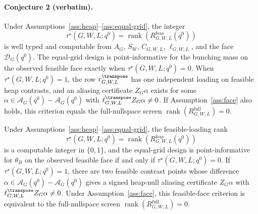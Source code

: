 
\paragraph{Conjecture 2 (verbatim).}
Under Assumptions~\ref{ass:heap}--\ref{ass:equal-grid}, the integer
\[
\tau^\star(G,W,L;q^0)=\operatorname{rank}(R^{\mathrm{feas}}_{G,W,L}(q^0))
\]
is well typed and computable from \(A_G\), \(S_W\), \(C_{G,W,L}\), \(\ell_{G,W,L}\), and the face \(\mathcal{D}_G(q^0)\).  The equal-grid design is point-informative for the bunching mass on the observed feasible face exactly when \(\tau^\star(G,W,L;q^0)=0\).  When \(\tau^\star(G,W,L;q^0)=1\), the row \(r_{G,W,L}^{\transpose}\) has one independent loading on feasible heap contrasts, and an aliasing certificate \(Z_G\alpha\) exists for some \(\alpha\in\mathcal{A}_G(q^0)-\mathcal{A}_G(q^0)\) with \(\ell_{G,W,L}^{\transpose}Z_G\alpha\neq0\).  If Assumption~\ref{ass:face} also holds, this criterion equals the full-nullspace screen \(\operatorname{rank}(R^{\mathrm{full}}_{G,W,L})=0\).

\begin{theorem}\label{thm:phase}
Under Assumptions~\ref{ass:heap}--\ref{ass:equal-grid}, the feasible-loading rank
\[
\tau^\star(G,W,L;q^0)=\operatorname{rank}(R^{\mathrm{feas}}_{G,W,L}(q^0))
\]
is a computable integer in \(\{0,1\}\), and the equal-grid design is point-informative for \(\theta_B\) on the observed feasible face if and only if \(\tau^\star(G,W,L;q^0)=0\).  If \(\tau^\star(G,W,L;q^0)=1\), there are two feasible contrast points whose difference \(\alpha\in\mathcal{A}_G(q^0)-\mathcal{A}_G(q^0)\) gives a signed heap-null aliasing certificate \(Z_G\alpha\) with \(\ell_{G,W,L}^{\transpose}Z_G\alpha\neq0\).  Under Assumption~\ref{ass:face}, this feasible-face criterion is equivalent to the full-nullspace screen \(\operatorname{rank}(R^{\mathrm{full}}_{G,W,L})=0\).
\end{theorem}

